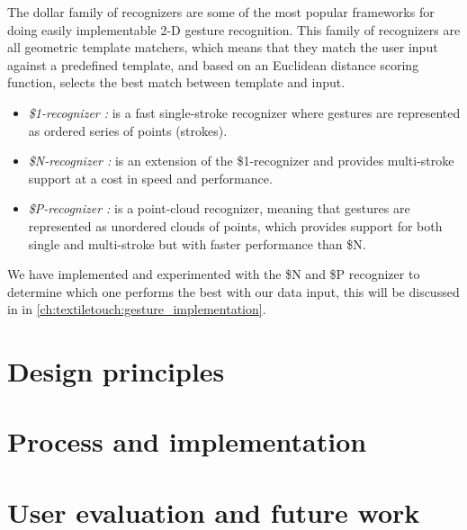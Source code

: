 The dollar family of recognizers \citep{anthony2010lightweight,vatavu2012gestures,wobbrock2007gestures} are some of the most popular frameworks for doing easily implementable 2-D gesture recognition.
This family of recognizers are all geometric template matchers, which means that they match the user input against a predefined template, and based on an Euclidean distance scoring function, selects the best match between template and input.
\begin{itemize}
  \item \emph{\$1-recognizer \citep{wobbrock2007gestures}:} is a fast single-stroke recognizer where gestures are represented as ordered series of points (strokes).
  \item \emph{\$N-recognizer \citep{anthony2010lightweight}:} is an extension of the \$1-recognizer and provides multi-stroke support at a cost in speed and performance.
  \item \emph{\$P-recognizer \citep{vatavu2012gestures}:} is a point-cloud recognizer, meaning that gestures are represented as unordered clouds of points, which provides support for both single and multi-stroke but with faster performance than \$N. 
\end{itemize}
We have implemented and experimented with the \$N and \$P recognizer to determine which one performs the best with our data input, this will be discussed in  in \ref{ch:textiletouch:gesture_implementation}.

\section{Design principles}


\section{Process and implementation}


\section{User evaluation and future work}
